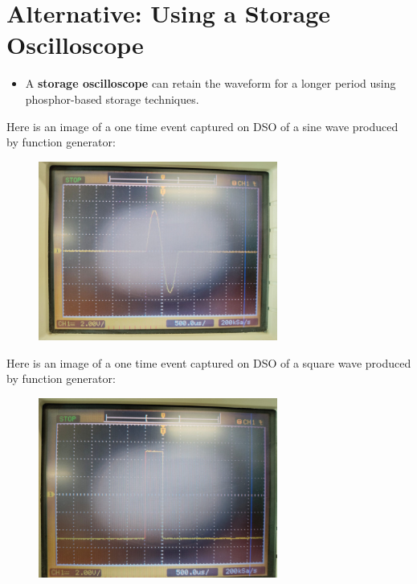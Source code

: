 \documentclass{article}
\begin{document}
\section{Alternative: Using a Storage Oscilloscope}
\begin{itemize}
    \item A \textbf{storage oscilloscope} can retain the waveform for a longer period using phosphor-based storage techniques.
\end{itemize}
Here is an image of a one time event captured on DSO of a sine wave produced by function generator:
\begin{figure}[H]
\centering
\includegraphics[width=0.7\textwidth]{figs/ofig1.png}
\end{figure}
Here is an image of a one time event captured on DSO of a square wave produced by function generator:
\begin{figure}[H]
\centering
\includegraphics[width=0.7\textwidth]{figs/ofig2.png}
\end{figure}
\end{document}
